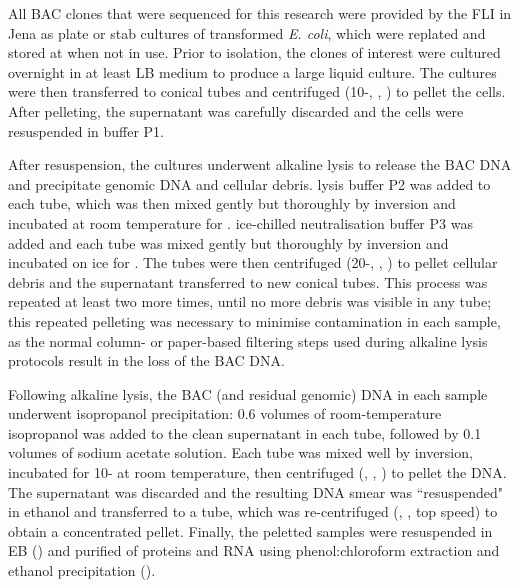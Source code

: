 
All BAC clones that were sequenced for this research were provided by the FLI in Jena as plate or stab cultures of transformed \textit{E. coli}, which were replated and stored at  when not in use. Prior to isolation, the clones of interest were cultured overnight in at least  LB medium to produce a large liquid culture. The cultures were then transferred to  conical tubes and centrifuged (10-, , ) to pellet the cells. After pelleting, the supernatant was carefully discarded and the cells were resuspended in  buffer P1.

After resuspension, the cultures underwent alkaline lysis to release the BAC DNA and precipitate genomic DNA and cellular debris.  lysis buffer P2 was added to each tube, which was then mixed gently but thoroughly by inversion and incubated at room temperature for .  ice-chilled neutralisation buffer P3 was added and each tube was mixed gently but thoroughly by inversion and incubated on ice for . The tubes were then centrifuged (20-, , ) to pellet cellular debris and the supernatant transferred to new conical tubes. This process was repeated at least two more times, until no more debris was visible in any tube; this repeated pelleting was necessary to minimise contamination in each sample, as the normal column- or paper-based filtering steps used during alkaline lysis protocols result in the loss of the BAC DNA.

Following alkaline lysis, the BAC (and residual genomic) DNA in each sample underwent isopropanol precipitation: 0.6 volumes of room-temperature isopropanol was added to the clean supernatant in each tube, followed by 0.1 volumes of  sodium acetate solution. Each tube was mixed well by inversion, incubated for 10- at room temperature, then centrifuged (, , ) to pellet the DNA. The supernatant was discarded and the resulting DNA smear was ``resuspended" in   ethanol and transferred to a  tube, which was re-centrifuged (, , top speed) to obtain a concentrated pellet. Finally, the peletted samples were resuspended in EB () and purified of proteins and RNA using phenol:chloroform extraction and ethanol precipitation ().


